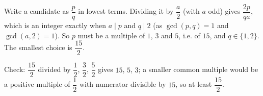 Write a candidate as $\dfrac {p}{q}$ in lowest terms. Dividing it by $\dfrac {a}{2}$ (with $a$ odd) gives $\dfrac{2p}{qa}$, which is an integer exactly when $a\mid p$ and $q\mid2$ (as $\gcd(p,q)=1$ and $\gcd(a,2)=1$). So $p$ must be a multiple of $1$, $3$ and $5$, i.e. of $15$, and $q\in\{1,2\}$. The smallest choice is $\boxed{\dfrac{15}{2}}$.

Check: $\dfrac{15}{2}$ divided by $\dfrac{1}{2}$, $\dfrac{3}{2}$, $\dfrac{5}{2}$ gives $15$, $5$, $3$; a smaller common multiple would be a positive multiple of $\dfrac{1}{2}$ with numerator divisible by $15$, so at least $\dfrac{15}{2}$.
